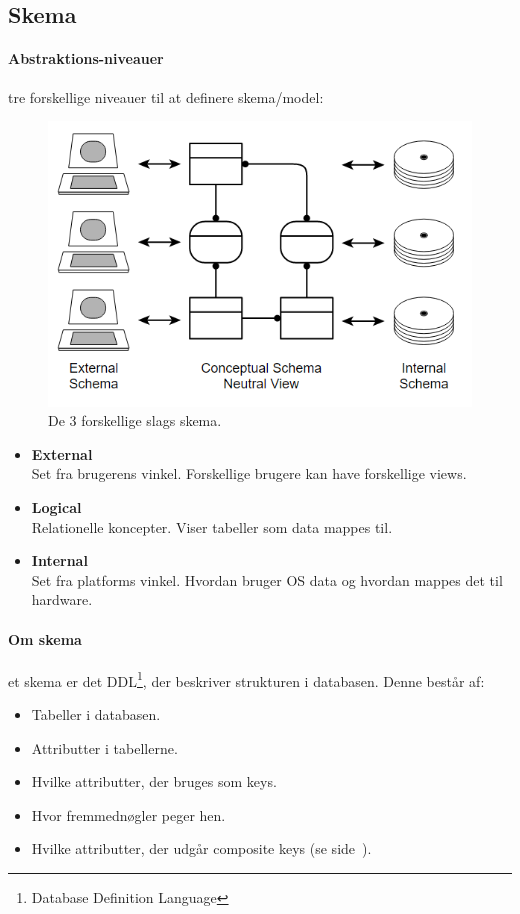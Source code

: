 \subsection{Skema}

\paragraph{Abstraktions-niveauer} tre forskellige niveauer til at definere skema/model:

\begin{figure}[h]
\centering
\includegraphics[width=0.7\linewidth]{figs/spm2/skema}
\caption{De 3 forskellige slags skema.}
\label{fig:skema}
\end{figure}


\begin{itemize}
	\item \textbf{External}\\
	Set fra brugerens vinkel. Forskellige brugere kan have forskellige views.
	\item \textbf{Logical}\\
	Relationelle koncepter. Viser tabeller som data mappes til.
	\item \textbf{Internal}\\
	Set fra platforms vinkel. Hvordan bruger OS data og hvordan mappes det til hardware.
\end{itemize}

\paragraph{Om skema} et skema er det DDL\footnote{Database Definition Language}, der beskriver strukturen i databasen. Denne består af:

\begin{itemize}
	\item Tabeller i databasen.
	\item Attributter i tabellerne.
	\item Hvilke attributter, der bruges som keys.
	\item Hvor fremmednøgler peger hen.
	\item Hvilke attributter, der udgår composite keys (se side~\pageref{sec:keys}).
\end{itemize}

